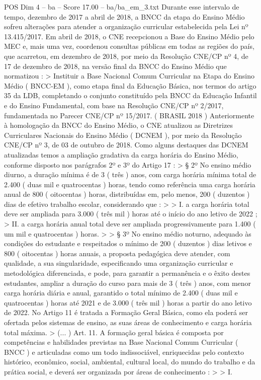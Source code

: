 \begin{textsample}{POS Dim 4 – ba – Score 17.00 – ba/ba\_em\_3.txt}
Durante esse intervalo de tempo, dezembro de 2017 a abril de 2018, a BNCC da etapa do Ensino Médio sofreu alterações para atender a organização curricular estabelecida pela Lei nº 13.415/2017.
Em abril de 2018, o CNE recepcionou a Base do Ensino Médio pelo MEC e, mais uma vez, coordenou consultas públicas em todas as regiões do país, que acarretou, em dezembro de 2018, por meio da Resolução CNE/CP nº 4, de 17 de dezembro de 2018, na versão final da BNCC do Ensino Médio que normatizou : > Instituir a Base Nacional Comum Curricular na Etapa do Ensino Médio ( BNCC-EM ), como etapa final da Educação Básica, nos termos do artigo 35 da LDB, completando o conjunto constituído pela BNCC da Educação Infantil e do Ensino Fundamental, com base na Resolução CNE/CP nº 2/2017, fundamentada no Parecer CNE/CP nº 15/2017. ( BRASIL 2018 ) Anteriormente à homologação da BNCC do Ensino Médio, o CNE atualizou as Diretrizes Curriculares Nacionais do Ensino Médio ( DCNEM ), por meio da Resolução CNE/CP nº 3, de 03 de outubro de 2018.
Como alguns destaques das DCNEM atualizadas temos a ampliação gradativa da carga horária do Ensino Médio, conforme disposto nos parágrafos 2º e 3º do Artigo 17 : > § 2º No ensino médio diurno, a duração mínima é de 3 ( três ) anos, com carga horária mínima total de 2.400 ( duas mil e quatrocentas ) horas, tendo como referência uma carga horária anual de 800 ( oitocentas ) horas, distribuídas em, pelo menos, 200 ( duzentos ) dias de efetivo trabalho escolar, considerando que : > > I. a carga horária total deve ser ampliada para 3.000 ( três mil ) horas até o início do ano letivo de 2022 ; > II. a carga horária anual total deve ser ampliada progressivamente para 1.400 ( um mil e quatrocentas ) horas. > > § 3º No ensino médio noturno, adequado às condições do estudante e respeitados o mínimo de 200 ( duzentos ) dias letivos e 800 ( oitocentas ) horas anuais, a proposta pedagógica deve atender, com qualidade, a sua singularidade, especificando uma organização curricular e metodológica diferenciada, e pode, para garantir a permanência e o êxito destes estudantes, ampliar a duração do curso para mais de 3 ( três ) anos, com menor carga horária diária e anual, garantido o total mínimo de 2.400 ( duas mil e quatrocentas ) horas até 2021 e de 3.000 ( três mil ) horas a partir do ano letivo de 2022.
No Artigo 11 é tratada a Formação Geral Básica, como ela poderá ser ofertada pelos sistemas de ensino, as suas áreas de conhecimento e carga horária total máxima. > (... ) Art. 11.
A formação geral básica é composta por competências e habilidades previstas na Base Nacional Comum Curricular ( BNCC ) e articuladas como um todo indissociável, enriquecidas pelo contexto histórico, econômico, social, ambiental, cultural local, do mundo do trabalho e da prática social, e deverá ser organizada por áreas de conhecimento : > > I.

\end{textsample}
